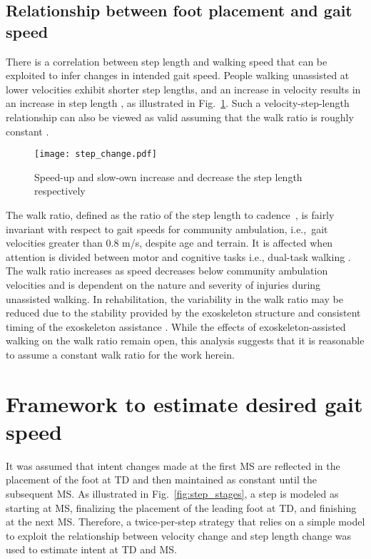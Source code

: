 \subsection{Relationship between foot placement and gait speed }
There is a correlation between step length and walking speed that can be exploited to infer changes in intended gait speed. People walking unassisted at lower velocities exhibit shorter step lengths, and an increase in velocity results in an increase in step length \cite{kuo2001simple,andriacchi1977walking}, as illustrated in Fig.~\ref{fig:step_change}. Such a velocity-step-length relationship can also be viewed as valid assuming that the walk ratio is roughly constant \cite{sekiya1997optimal}. 
%
\begin{figure}
	\centering
	\texttt{[image: step\_change.pdf]}
	\caption{Speed-up and slow-own increase and decrease the step length respectively}\label{fig:step_change}
\end{figure}
%
The walk ratio, defined as the ratio of the step length to cadence~\cite{rota2011walk}, is fairly invariant with respect to gait speeds for community ambulation, i.e.,~gait velocities greater than 0.8 m/s, despite age and terrain. It is affected when attention is divided between motor and cognitive tasks i.e., dual-task walking \cite{bogen2018walk}. The walk ratio increases as speed decreases below community ambulation velocities \cite{murakami2017estimated} and is dependent on the nature and severity of injuries \cite{rota2011walk} during unassisted walking. In rehabilitation, the variability in the walk ratio may be reduced due to the stability provided by the exoskeleton structure and consistent timing of the exoskeleton assistance \cite{seo2015new}. While the effects of exoskeleton-assisted walking on the walk ratio remain open, this analysis suggests that it is reasonable to assume a constant walk ratio for the work herein.

\section{Framework to estimate desired gait speed}\label{sec:BKF}

It was assumed that intent changes made at the first MS are reflected in the placement of the foot at TD and then maintained as constant until the subsequent MS. As illustrated in Fig.~\ref{fig:step_stages}, a step is modeled as starting at MS, finalizing the placement of the leading foot at TD, and finishing at the next MS. Therefore, a twice-per-step strategy that relies on a simple model to exploit the relationship between velocity change and step length change was used to estimate intent at TD and MS. 

